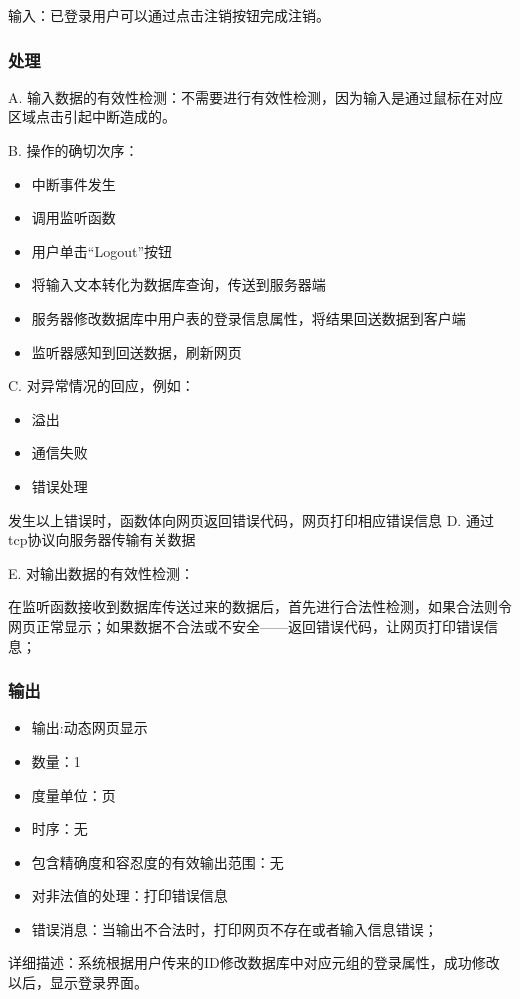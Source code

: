 			输入：已登录用户可以通过点击注销按钮完成注销。
			
			\subsubsection{处理}
			
			
			
			A. 输入数据的有效性检测：不需要进行有效性检测，因为输入是通过鼠标在对应区域点击引起中断造成的。
			
			B. 操作的确切次序：
			\begin{adjustwidth}{2cm}{1cm}\qquad
				\begin{itemize}
					\item 中断事件发生
					\item 调用监听函数
					\item 用户单击“Logout”按钮
					\item 将输入文本转化为数据库查询，传送到服务器端
					\item 服务器修改数据库中用户表的登录信息属性，将结果回送数据到客户端
					\item 监听器感知到回送数据，刷新网页
				\end{itemize}		
			\end{adjustwidth}
			 
			
			C. 对异常情况的回应，例如：
			\begin{adjustwidth}{2cm}{1cm}\qquad
				\begin{itemize}
					\item 溢出
					\item 通信失败
					\item 错误处理
				\end{itemize}		
			\end{adjustwidth}
			
				发生以上错误时，函数体向网页返回错误代码，网页打印相应错误信息
			D. 通过tcp协议向服务器传输有关数据
					
			E. 对输出数据的有效性检测：
			
			在监听函数接收到数据库传送过来的数据后，首先进行合法性检测，如果合法则令网页正常显示；如果数据不合法或不安全——返回错误代码，让网页打印错误信息；
			
			\subsubsection{输出}
			\begin{itemize}
				\item	输出:动态网页显示
				\item	数量：1
				\item	度量单位：页
				\item	时序：无
				\item	包含精确度和容忍度的有效输出范围：无
				\item	对非法值的处理：打印错误信息
				\item	错误消息：当输出不合法时，打印网页不存在或者输入信息错误；
			   \end{itemize}
			   详细描述：系统根据用户传来的ID修改数据库中对应元组的登录属性，成功修改以后，显示登录界面。

